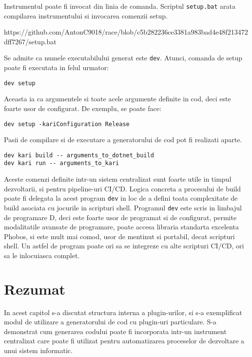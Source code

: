 \documentclass{report}
\begin{document}
Instrumentul poate fi invocat din linia de comanda. Scriptul
\texttt{setup.bat} arata compilarea instrumentului si invocarea comenzii
setup.

https://github.com/AntonC9018/race/blob/c5b282236ce3381a983bad4e48f213472dff7267/setup.bat

Se admite ca numele executabilului generat este \texttt{dev}. Atunci,
comanda de setup poate fi executata in felul urmator:

\begin{verbatim}
dev setup
\end{verbatim}

Aceasta ia ca argumentele si toate acele argumente definite in cod, deci
este foarte usor de configurat. De exemplu, se poate face:

\begin{verbatim}
dev setup -kariConfiguration Release
\end{verbatim}

Pasii de compilare si de executare a generatorului de cod pot fi
realizati aparte.

\begin{verbatim}
dev kari build -- arguments_to_dotnet_build
dev kari run -- arguments_to_kari
\end{verbatim}

Aceste comenzi definite intr-un sistem centralizat sunt foarte utile in
timpul dezvoltarii, si pentru pipeline-uri CI/CD. Logica concreta a
procesului de build poate fi delegata la acest program \texttt{dev} in
loc de a defini toata complexitate de build asociata cu jocurile in
scripturi shell. Programul \texttt{dev} este scris in limbajul de
programare D, deci este foarte usor de programat si de configurat,
permite modalitatile avansate de programare, poate accesa libraria
standarta excelenta Phobos, si este mult mai comod, usor de mentinut si
portabil, decat scripturi shell. Un astfel de program poate ori sa se
integreze cu alte scripturi CI/CD, ori sa le inlocuiasca complet.

\section{Rezumat}

In acest capitol s-a discutat structura interna a plugin-urilor, si s-a
exemplificat modul de utilizare a generatorului de cod cu plugin-uri
particulare. S-a demonstrat cum generarea codului poate fi incorporata
intr-un instrument centralizat care poate fi utilizat pentru
automatizarea proceselor de dezvoltare a unui sistem informatic.
\end{document}
